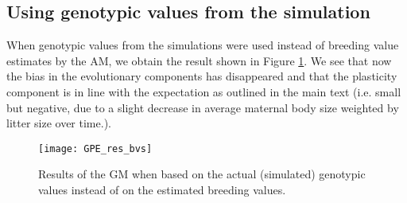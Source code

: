 \subsection{Using genotypic values from the simulation}\label{app:elln:bvs}
When genotypic values from the simulations were used instead of breeding value estimates by the AM, we obtain the result shown in Figure \ref{fig:gpeGV}. We see that now the bias in the evolutionary components has disappeared and that the plasticity component is in line with the expectation as outlined in the main text (i.e. small but negative, due to a slight decrease in average maternal body size weighted by litter size over time.).
\begin{figure}[b]
\texttt{[image: GPE\_res\_bvs]}
\caption{Results of the GM when based on the actual (simulated) genotypic values instead of on the estimated breeding values.}
\label{fig:gpeGV}
\end{figure}


